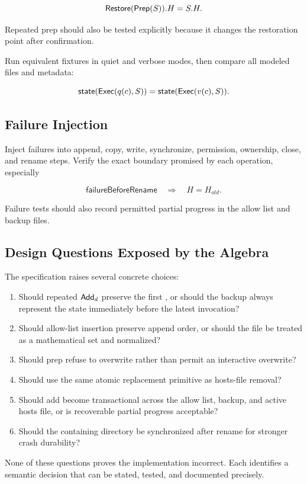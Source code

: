\[
  \mathsf{Restore}(\mathsf{Prep}(S)).H=S.H.
\]

Repeated prep should also be tested explicitly because it changes the
restoration point after confirmation.

Run equivalent fixtures in quiet and verbose modes, then compare all modeled
files and metadata:

\[
  \mathsf{state}(\mathsf{Exec}(q(c),S))=\mathsf{state}(\mathsf{Exec}(v(c),S)).
\]

\subsection{Failure Injection}

Inject failures into append, copy, write, synchronize, permission, ownership,
close, and rename steps.  Verify the exact boundary promised by each
operation, especially

\[
  \mathsf{failureBeforeRename}
  \quad\Longrightarrow\quad H=H_{old}.
\]

Failure tests should also record permitted partial progress in the allow list
and backup files.

\subsection{Design Questions Exposed by the Algebra}

The specification raises several concrete choices:

\begin{enumerate}
  \item Should repeated $\mathsf{Add}_{d}$ preserve the first , or
        should the backup always represent the state immediately before the
        latest invocation?
  \item Should allow-list insertion preserve append order, or should the file
        be treated as a mathematical set and normalized?
  \item Should prep refuse to overwrite  rather than permit an
        interactive overwrite?
  \item Should  use the same atomic replacement primitive as
        hosts-file removal?
  \item Should add become transactional across the allow list, backup, and
        active hosts file, or is recoverable partial progress acceptable?
  \item Should the containing directory be synchronized after rename for
        stronger crash durability?
\end{enumerate}

None of these questions proves the implementation incorrect.  Each identifies
a semantic decision that can be stated, tested, and documented precisely.
